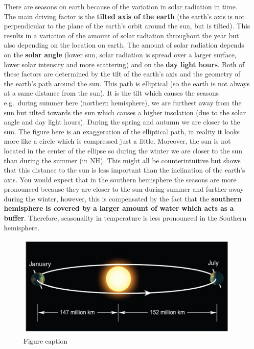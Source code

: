 \documentclass[oneside]{book}
\begin{document}
There are seasons on earth because of the variation in solar radiation
in time. The main driving factor is the \textbf{tilted axis of the
earth} (the earth's axis is not perpendicular to the plane of the
earth's orbit around the sun, but is tilted). This results in a
variation of the amount of solar radiation throughout the year but also
depending on the location on earth. The amount of solar radiation
depends on the \textbf{solar angle} (lower sun, solar radiation is
spread over a larger surface, lower solar intensity and more scattering)
and on the \textbf{day light hours}. Both of these factors are
determined by the tilt of the earth's axis and the geometry of the
earth's path around the sun. This path is elliptical (so the earth is
not always at a same distance from the sun). It is the tilt which causes
the seasons e.g.~during summer here (northern hemisphere), we are
furthest away from the sun but tilted towards the sun which causes a
higher insolation (due to the solar angle and day light hours). During
the spring and autumn we are closer to the sun. The figure here is an
exaggeration of the elliptical path, in reality it looks more like a
circle which is compressed just a little. Moreover, the sun is not
located in the center of the ellipse so during the winter we are closer
to the sun than during the summer (in NH). This might all be
counterintuitive but shows that this distance to the sun is less
important than the inclination of the earth's axis. You would expect
that in the southern hemisphere the seasons are more pronounced because
they are closer to the sun during summer and further away during the
winter, however, this is compensated by the fact that the
\textbf{southern hemisphere is covered by a larger amount of water which
acts as a buffer}. Therefore, seasonality in temperature is less
pronounced in the Southern hemisphere.

\begin{figure}
\centering
\includegraphics{figures/Figure22.png}
\caption{\label{fig:Sun}Figure caption}
\end{figure}
\end{document}
